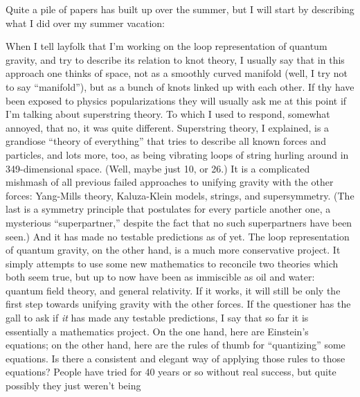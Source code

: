 \documentclass{article}
\def\tightlist{}
\renewcommand{\texttt}[1]{%
  \begingroup
  \ttfamily
  \begingroup\lccode`~=`/\lowercase{\endgroup\def~}{/\discretionary{}{}{}}%
  \begingroup\lccode`~=`[\lowercase{\endgroup\def~}{[\discretionary{}{}{}}%
  \begingroup\lccode`~=`.\lowercase{\endgroup\def~}{.\discretionary{}{}{}}%
  \catcode`/=\active\catcode`[=\active\catcode`.=\active
  \scantokens{#1\noexpand}%
  \endgroup
}
\begin{document}
Quite a pile of papers has built up over the summer, but I will start by
describing what I did over my summer vacation:


When I tell layfolk that I'm working on the loop representation of
quantum gravity, and try to describe its relation to knot theory, I
usually say that in this approach one thinks of space, not as a smoothly
curved manifold (well, I try not to say ``manifold''), but as a bunch of
knots linked up with each other. If thy have been exposed to physics
popularizations they will usually ask me at this point if I'm talking
about superstring theory. To which I used to respond, somewhat annoyed,
that no, it was quite different. Superstring theory, I explained, is a
grandiose ``theory of everything'' that tries to describe all known
forces and particles, and lots more, too, as being vibrating loops of
string hurling around in 349-dimensional space. (Well, maybe just 10, or
26.) It is a complicated mishmash of all previous failed approaches to
unifying gravity with the other forces: Yang-Mills theory, Kaluza-Klein
models, strings, and supersymmetry. (The last is a symmetry principle
that postulates for every particle another one, a mysterious
``superpartner,'' despite the fact that no such superpartners have been
seen.) And it has made no testable predictions as of yet. The loop
representation of quantum gravity, on the other hand, is a much more
conservative project. It simply attempts to use some new mathematics to
reconcile two theories which both seem true, but up to now have been as
immiscible as oil and water: quantum field theory, and general
relativity. If it works, it will still be only the first step towards
unifying gravity with the other forces. If the questioner has the gall
to ask if \emph{it} has made any testable predictions, I say that so far
it is essentially a mathematics project. On the one hand, here are
Einstein's equations; on the other hand, here are the rules of thumb for
``quantizing'' some equations. Is there a consistent and elegant way of
applying those rules to those equations? People have tried for 40 years
or so without real success, but quite possibly they just weren't being
\end{document}

